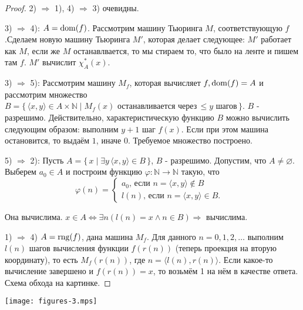 \begin{proof}
	2) $\Rightarrow$ 1), 4) $\Rightarrow$ 3) очевидны.

	3) $\Rightarrow$ 4): $A=\operatorname{dom}(f)$. Рассмотрим машину Тьюринга $M$, соответствующую $f$.Сделаем новую машину
	Тьюринга $M'$, которая делает следующее: $M'$ работает как $M$, если же $M$ останавлвается, то мы стираем то,
	что было на ленте и пишем там $f$. $M'$ вычислит $\chi^*_{A}(x)$.

	3) $\Rightarrow$ 5): Рассмотрим машину $M_f$, которая вычисляет $f, \operatorname{dom}(f)=A$ и рассмотрим множество $B =
	\{\,\langle x,y\rangle\in A\times\mathbb{N}\mid M_{f}(x)\mbox{ останавливается через}\,\leqslant y\mbox{ шагов}
	\,\}$. $B$ - разрешимо. Действительно, характеристическую функцию $B$ можно вычислить следующим образом:
	выполним $y+1$ шаг $f(x)$. Если при этом машина остановится, то выдаём $1$, иначе $0$. Требуемое множество
	построено.

	5) $\Rightarrow$ 2): Пусть $A = \{\,x\mid \exists y\,\langle x,y\rangle \in B\,\}$, $B$ - разрешимо.
	Допустим, что $A\neq\varnothing$. Выберем $a_0\in A$ и построим функцию
	$\varphi: \mathbb{N} \to \mathbb{N}$ такую, что 
	\begin{equation*}
		\varphi(n) = 
		\begin{cases}
			a_{0}\text{, если }n=\langle x,y\rangle\notin B&\\
			l(n)\text{, если }n=\langle x,y\rangle \in B.&
		\end{cases}
	\end{equation*}

	Она вычислима. $x \in A \iff \exists n (l(n)=x \land n \in B) \Rightarrow$ вычислима.
	
	1) $\Rightarrow$ 4) $A = \operatorname{rng}(f)$, дана машина $M_f$. Для данного $n=0,1,2,\ldots$ выполним $l(n)$ шагов
	вычисления функции $f(r(n))$ (теперь проекция на вторую координату), то есть $M_{f}(r(n))$, где $n = \langle l(n),
	r(n)\rangle$. Если какое-то вычисление завершено и $f(r(n))=x$, то возьмём 1 на нём в качестве
	ответа. Схема обхода на картинке.
\end{proof}
\begin{center}
	\texttt{[image: figures-3.mps]}
\end{center}
